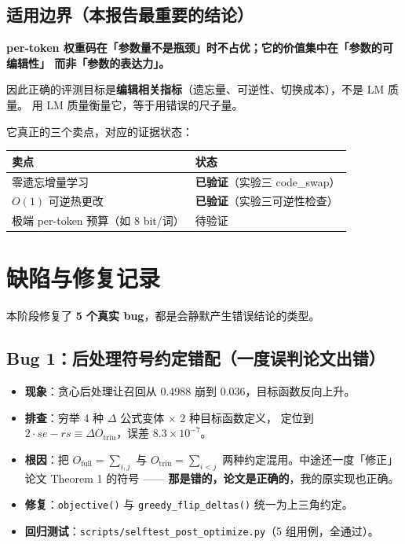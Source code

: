 \documentclass[11pt,a4paper]{ctexart}
\newcommand{\ok}[1]{\textcolor{okgreen}{\textbf{#1}}}
\newcommand{\keybox}[1]{%
  \begin{center}\begin{minipage}{0.95\textwidth}%
  \colorbox{graylight}{\begin{minipage}{0.93\textwidth}\vspace{3pt}#1\vspace{3pt}\end{minipage}}%
  \end{minipage}\end{center}}
\begin{document}
\subsection{适用边界（本报告最重要的结论）}

\keybox{%
\textbf{per-token 权重码在「参数量不是瓶颈」时不占优；它的价值集中在「参数的可编辑性」
而非「参数的表达力」。}

因此正确的评测目标是\textbf{编辑相关指标}（遗忘量、可逆性、切换成本），不是 LM 质量。
用 LM 质量衡量它，等于用错误的尺子量。}

它真正的三个卖点，对应的证据状态：

\begin{center}
\begin{tabularx}{\textwidth}{@{}Xl@{}}
\toprule
\textbf{卖点} & \textbf{状态} \\
\midrule
零遗忘增量学习 & \ok{已验证}（实验三 code\_swap） \\
$O(1)$ 可逆热更改 & \ok{已验证}（实验三可逆性检查） \\
极端 per-token 预算（如 8 bit/词） & 待验证 \\
\bottomrule
\end{tabularx}
\end{center}

\section{缺陷与修复记录}

本阶段修复了 \textbf{5 个真实 bug}，都是会静默产生错误结论的类型。

\subsection{Bug 1：后处理符号约定错配（一度误判论文出错）}

\begin{itemize}
\item \textbf{现象}：贪心后处理让召回从 0.4988 崩到 0.036，目标函数反向上升。
\item \textbf{排查}：穷举 4 种 $\Delta$ 公式变体 $\times$ 2 种目标函数定义，
      定位到 $2\cdot se - rs \equiv \Delta O_{\text{triu}}$，误差 $8.3\times10^{-7}$。
\item \textbf{根因}：把 $O_{\text{full}}=\sum_{i,j}$ 与 $O_{\text{triu}}=\sum_{i<j}$
      两种约定混用。中途还一度「修正」论文 Theorem 1 的符号 ——
      \ok{那是错的，论文是正确的}，我的原实现也正确。
\item \textbf{修复}：\texttt{objective()} 与 \texttt{greedy\_flip\_deltas()} 统一为上三角约定。
\item \textbf{回归测试}：\texttt{scripts/selftest\_post\_optimize.py}（5 组用例，全通过）。
\end{itemize}
\end{document}
